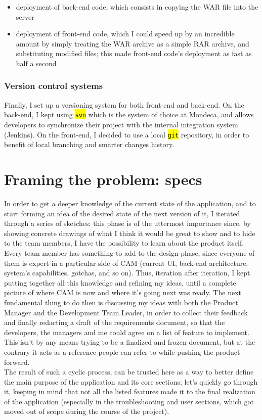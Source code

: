 \documentclass[12pt,oneside,svgnames]{memoir}
\let\OldTexttt\texttt
\renewcommand{\texttt}[1]{\OldTexttt{\hl{#1}}}
\begin{document}
\begin{itemize}
\itemsep1pt\parskip0pt
\item
  deployment of back-end code, which consists in copying the WAR file
  into the server
\item
  deployment of front-end code, which I could speed up by an incredible
  amount by simply treating the WAR archive as a simple RAR archive, and
  substituting modified files; this made front-end code's deployment as
  fast as half a second
\end{itemize}

\subsubsection*{Version control systems}\label{version-control-systems}

Finally, I set up a versioning system for both front-end and back-end.
On the back-end, I kept using \texttt{svn} which is the system of choice
at Mondeca, and allows developers to synchronize their project with the
internal integration system (Jenkins). On the front-end, I decided to
use a local \texttt{git} repository, in order to benefit of local
branching and smarter changes history.

\section{Framing the problem: specs}\label{framing-the-problem-specs}

In order to get a deeper knowledge of the current state of the
application, and to start forming an idea of the desired state of the
next version of it, I iterated through a series of sketches; this phase
is of the uttermost importance since, by showing concrete drawings of
what I think it would be great to show and to hide to the team members,
I have the possibility to learn about the product itself. Every team
member has something to add to the design phase, since everyone of them
is expert in a particular side of CAM (current UI, back-end
architecture, system's capabilities, gotchas, and so on). Thus,
iteration after iteration, I kept putting together all this knowledge
and refining my ideas, until a complete picture of where CAM is now and
where it's going next was ready. The next fundamental thing to do then
is discussing my ideas with both the Product Manager and the Development
Team Leader, in order to collect their feedback and finally redacting a
draft of the requirements document, so that the developers, the managers
and me could agree on a list of feature to implement. This isn't by any
means trying to be a finalized and frozen document, but at the contrary
it acts as a reference people can refer to while pushing the product
forward.\\The result of such a cyclic process, can be trusted here as a
way to better define the main purpose of the application and its core
sections; let's quickly go through it, keeping in mind that not all the
listed features made it to the final realization of the application
(especially in the troubleshooting and user sections, which got moved
out of scope during the course of the project).
\end{document}
